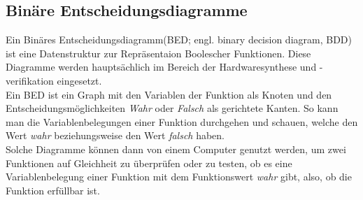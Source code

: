\subsection{Binäre Entscheidungsdiagramme}
Ein Binäres Entscheidungsdiagramm(BED; engl. binary decision diagram, BDD) ist eine Datenstruktur zur Repräsentaion Boolescher Funktionen. Diese Diagramme werden hauptsächlich im Bereich der Hardwaresynthese und -verifikation eingesetzt.\\
Ein BED ist ein Graph mit den Variablen der Funktion als Knoten und den Entscheidungsmöglichkeiten \emph{Wahr} oder \emph{Falsch} als gerichtete Kanten. So kann man die Variablenbelegungen einer Funktion durchgehen und schauen, welche den Wert \emph{wahr} beziehungsweise den Wert \emph{falsch} haben.\\
Solche Diagramme können dann von einem Computer genutzt werden, um zwei Funktionen auf Gleichheit zu überprüfen oder zu testen, ob es eine Variablenbelegung einer Funktion mit dem Funktionswert \emph{wahr} gibt, also, ob die Funktion erfüllbar ist.

